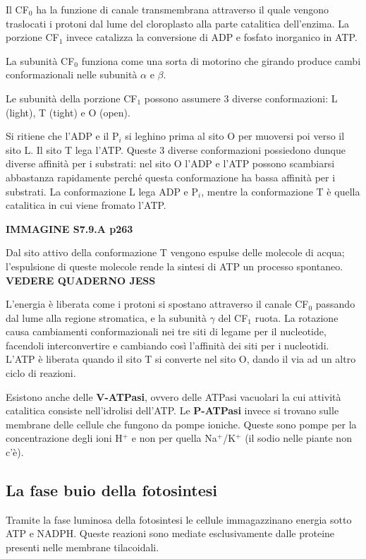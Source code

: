 \documentclass[]{article}
\begin{document}
Il CF$_0$ ha la funzione di canale transmembrana attraverso il quale
vengono traslocati i protoni dal lume del cloroplasto alla parte
catalitica dell'enzima. La porzione CF$_1$ invece catalizza la
conversione di ADP e fosfato inorganico in ATP.

La subunità CF$_0$ funziona come una sorta di motorino che girando
produce cambi conformazionali nelle subunità $\alpha$ e $\beta$.

Le subunità della porzione CF$_1$ possono assumere 3 diverse
conformazioni: L (light), T (tight) e O (open).

Si ritiene che l'ADP e il P$_i$ si leghino prima al sito O per muoversi
poi verso il sito L. Il sito T lega l'ATP. Queste 3 diverse
conformazioni possiedono dunque diverse affinità per i substrati: nel
sito O l'ADP e l'ATP possono scambiarsi abbastanza rapidamente perché
questa conformazione ha bassa affinità per i substrati. La conformazione
L lega ADP e P$_i$, mentre la conformazione T è quella catalitica in cui
viene fromato l'ATP.

\textbf{IMMAGINE S7.9.A p263}

Dal sito attivo della conformazione T vengono espulse delle molecole di
acqua; l'espulsione di queste molecole rende la sintesi di ATP un
processo spontaneo. \textbf{VEDERE QUADERNO JESS}

L'energia è liberata come i protoni si spostano attraverso il canale
CF$_0$ passando dal lume alla regione stromatica, e la subunità $\gamma$
del CF$_1$ ruota. La rotazione causa cambiamenti conformazionali nei tre
siti di legame per il nucleotide, facendoli interconvertire e cambiando
così l'affinità dei siti per i nucleotidi. L'ATP è liberata quando il
sito T si converte nel sito O, dando il via ad un altro ciclo di
reazioni.

Esistono anche delle \textbf{V-ATPasi}, ovvero delle ATPasi vacuolari la
cui attività catalitica consiste nell'idrolisi dell'ATP. Le
\textbf{P-ATPasi} invece si trovano sulle membrane delle cellule che
fungono da pompe ioniche. Queste sono pompe per la concentrazione degli
ioni H$^+$ e non per quella Na$^+$/K$^+$ (il sodio nelle piante non
c'è).

\subsection{La fase buio della
fotosintesi}\label{la-fase-buio-della-fotosintesi}

Tramite la fase luminosa della fotosintesi le cellule immagazzinano
energia sotto ATP e NADPH. Queste reazioni sono mediate esclusivamente
dalle proteine presenti nelle membrane tilacoidali.
\end{document}
